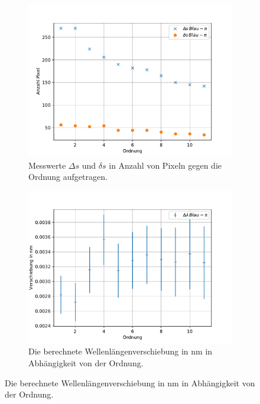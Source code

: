 \begin{figure}
    \begin{subfigure}{0.48\textwidth}
        \centering
        \includegraphics{content/data/blau_pi_messwerte.pdf}
        \caption{Messwerte $\Delta s$ und $\delta s$ in Anzahl von Pixeln gegen die Ordnung aufgetragen.}
        \label{subfig:blau_pi_mess}
    \end{subfigure}
    \hfill
    \begin{subfigure}
        \centering
        \includegraphics{content/data/blau_pi_verschiebung.pdf}
        \caption{Die berechnete Wellenlängenverschiebung in $\si{\nano\meter}$ in Abhängigkeit von der Ordnung.}
        \label{subfig:blau_pi_versch}
    \end{subfigure}
    \label{fig:blau_pi_mess_versch}
\end{figure}

